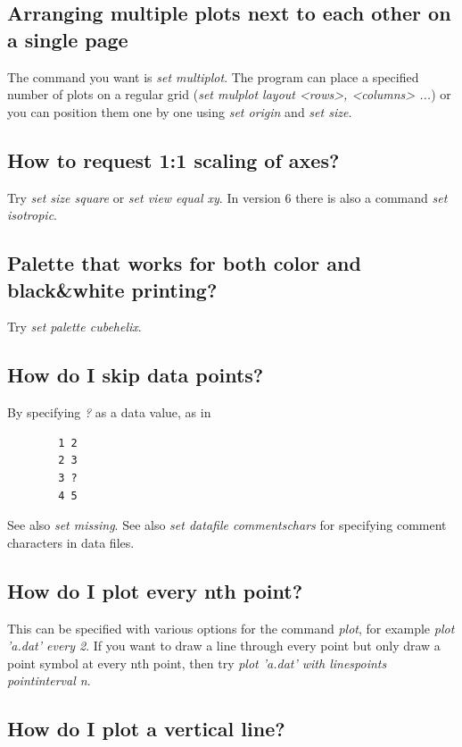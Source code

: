 \documentclass[letter,11pt]{article}
\begin{document}
{\subsection{Arranging multiple plots next to each other on a single page}

The command you want is {\em set multiplot}.  The program can place
a specified number of plots on a regular grid
({\em set mulplot layout <rows>, <columns> ...}) or you can position them
one by one using {\em set origin} and {\em set size}.

\subsection{How to request 1:1 scaling of axes?}

Try {\em set size square} or {\em set view equal xy}.
In version 6 there is also a command {\em set isotropic}.

\subsection{Palette that works for both color and black\&white printing?}

Try {\em set palette cubehelix}.

\subsection{How do I skip data points?}

By specifying \textit{?} as a data value, as in
\small
\begin{verbatim}
        1 2
        2 3
        3 ?
        4 5
\end{verbatim}
\normalsize

See also \textit{set missing}.
See also \textit{set datafile commentschars} for specifying comment characters in
data files.


\subsection{How do I plot every nth point?}

This can be specified with various options for the command {\em plot},
for example {\em plot 'a.dat' every 2}.  If you want to draw a line
through every point but only draw a point symbol at every nth point,
then try {\em plot 'a.dat' with linespoints pointinterval n}.


\subsection{How do I plot a vertical line?}

}
\end{document}
